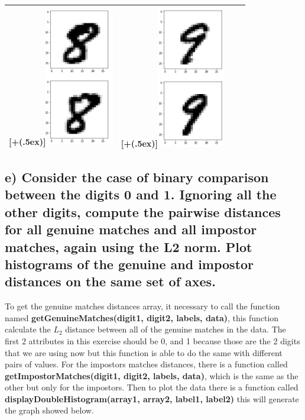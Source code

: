 \documentclass[11pt,letterpaper]{article}
\newcommand*{\addheight}[2][.5ex]{%
  \raisebox{0pt}[\dimexpr\height+(#1)\relax]{#2}%
}
\begin{document}
\begin{tabular}{|c|c|c|c|}
      \addheight{\includegraphics[width=30mm]{img/1-d/8.png}} &
      \addheight{\includegraphics[width=30mm]{img/1-d/9.png}} \\
      \hline
\end{tabular}

\newpage
\subsection{e) Consider the case of binary comparison between the digits 0 and 1. Ignoring all the other digits, compute the pairwise distances for all genuine matches and all impostor matches, again using the L2 norm. Plot histograms of the genuine and impostor distances on the same set of axes.}
To get the genuine matches distances array, it necessary to call the function named \textbf{getGenuineMatches(digit1, digit2, labels, data)}, this function calculate the $L_2$ distance between all of the genuine matches in the data. The first 2 attributes in this exercise should be 0, and 1 because those are the 2 digits that we are using now but this function is able to do the same with different pairs of values. For the impostors matches distances, there is a function called \textbf{getImpostorMatches(digit1, digit2, labels, data)}, which is the same as the other but only for the impostors. Then to plot the data there is a function called \textbf{displayDoubleHistogram(array1, array2, label1, label2)} this will generate the graph showed below.
\end{document}

